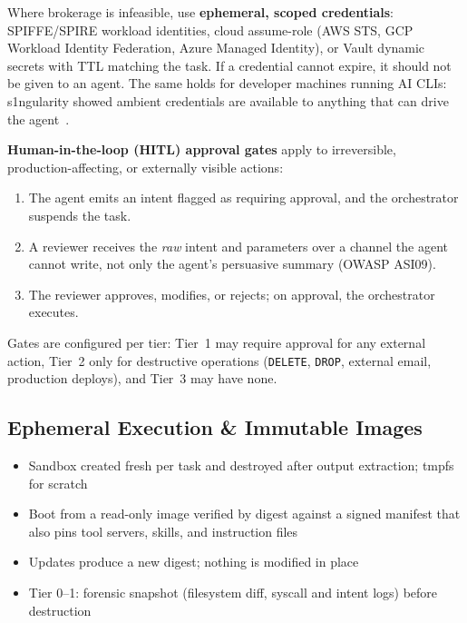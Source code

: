 \documentclass[11pt,letterpaper]{article}
\begin{document}
\begin{hardwarebox}
Where brokerage is infeasible, use \textbf{ephemeral, scoped credentials}: SPIFFE/SPIRE workload identities, cloud assume-role (AWS STS, GCP Workload Identity Federation, Azure Managed Identity), or Vault dynamic secrets with TTL matching the task. If a credential cannot expire, it should not be given to an agent. The same holds for developer machines running AI CLIs: s1ngularity showed ambient credentials are available to anything that can drive the agent~\cite{nx}.
\end{hardwarebox}

\textbf{Human-in-the-loop (HITL) approval gates} apply to irreversible, production-affecting, or externally visible actions:
\begin{enumerate}
  \item The agent emits an intent flagged as requiring approval, and the orchestrator suspends the task.
  \item A reviewer receives the \emph{raw} intent and parameters over a channel the agent cannot write, not only the agent's persuasive summary (OWASP ASI09).
  \item The reviewer approves, modifies, or rejects; on approval, the orchestrator executes.
\end{enumerate}
Gates are configured per tier: Tier~1 may require approval for any external action, Tier~2 only for destructive operations (\texttt{DELETE}, \texttt{DROP}, external email, production deploys), and Tier~3 may have none.

\subsection{Ephemeral Execution \& Immutable Images}
\label{sec:ephemeral}

\begin{keybox}
\begin{itemize}
  \item Sandbox created fresh per task and destroyed after output extraction; tmpfs for scratch
  \item Boot from a read-only image verified by digest against a signed manifest that also pins tool servers, skills, and instruction files
  \item Updates produce a new digest; nothing is modified in place
  \item Tier 0--1: forensic snapshot (filesystem diff, syscall and intent logs) before destruction
\end{itemize}
\end{keybox}
\end{document}
